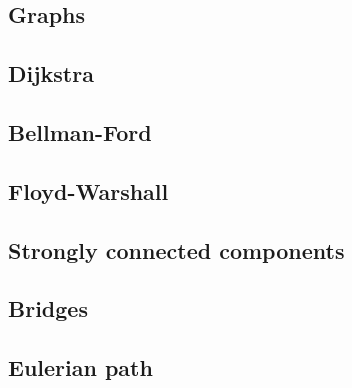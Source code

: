 \documentclass[10pt]{extarticle}
\begin{document}
\begin{multicols*}{3}
\section{Graphs}

\subsection{Dijkstra}


\subsection{Bellman-Ford}


\subsection{Floyd-Warshall}


\subsection{Strongly connected components} %


\subsection{Bridges} %


\subsection{Eulerian path} %



\end{multicols*}
\end{document}
